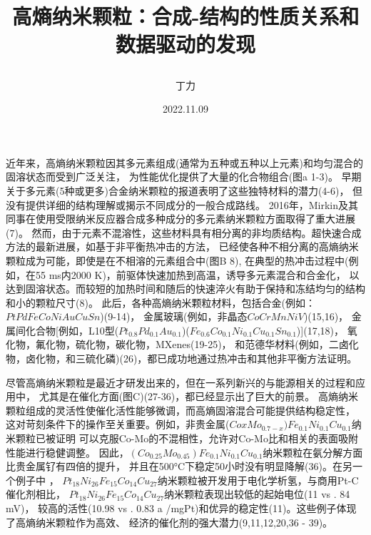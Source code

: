 \documentclass[a4paper]{article}
\title{
    高熵纳米颗粒：合成-结构的性质关系和数据驱动的发现
    
    }
\author{\songti 丁力}
\date{2022.11.09}
\begin{document}
    \maketitle
\iffalse
\begin{abstract}
    \lipsum[2]
\end{abstract}
\fi 
近年来，高熵纳米颗粒因其多元素组成(通常为五种或五种以上元素)和均匀混合的固溶状态而受到广泛关注，
为性能优化提供了大量的化合物组合(图a 1-3)。
早期关于多元素(5种或更多)合金纳米颗粒的报道表明了这些独特材料的潜力(4-6)，
但没有提供详细的结构理解或揭示不同成分的一般合成路线。
2016年，Mirkin及其同事在使用受限纳米反应器合成多种成分的多元素纳米颗粒方面取得了重大进展(7)。
然而，由于元素不混溶性，这些材料具有相分离的非均质结构。超快速合成方法的最新进展，如基于非平衡热冲击的方法，
已经使各种不相分离的高熵纳米颗粒成为可能，即使是在不相溶的元素组合中(图B 8),
在典型的热冲击过程中(例如，在55 ms内2000 K)，前驱体快速加热到高温，诱导多元素混合和合金化，
以达到固溶状态。而较短的加热时间和随后的快速淬火有助于保持和冻结均匀的结构和小的颗粒尺寸(8)。
此后，各种高熵纳米颗粒材料，包括合金(例如：$PtPdFeCoNiAuCuSn$)(9-14)，
金属玻璃(例如，非晶态$CoCrMnNiV$)(15,16)，
金属间化合物[例如，L10型($Pt_{0.8}Pd_{0.1}Au_{0.1}$)($Fe_{0.6}Co_{0.1}Ni_{0.1}Cu_{0.1}Sn_{0.1}$)](17,18)，
氧化物，氟化物，硫化物，碳化物，MXenes(19-25)，
和范德华材料(例如，二卤化物，卤化物，和三硫化磷)(26)，都已成功地通过热冲击和其他非平衡方法证明。


尽管高熵纳米颗粒是最近才研发出来的，但在一系列新兴的与能源相关的过程和应用中，
尤其是在催化方面(图C)(27-36)，都已经显示出了巨大的前景。
高熵纳米颗粒组成的灵活性使催化活性能够微调，而高熵固溶混合可能提供结构稳定性，
这对苛刻条件下的操作至关重要。例如，非贵金属($CoxMo_{0.7-x})Fe_{0.1}Ni_{0.1}Cu_{0.1}$纳米颗粒已被证明
可以克服Co-Mo的不混相性，允许对Co-Mo比和相关的表面吸附性能进行稳健调整。
因此，$(Co_{0.25}Mo_{0.45})Fe_{0.1}Ni_{0.1}Cu_{0.1}$纳米颗粒在氨分解方面比贵金属钌有四倍的提升，
并且在500°C下稳定50小时没有明显降解(36)。在另一个例子中 ，
$Pt_{18}Ni_{26}Fe_{15}Co_{14}Cu_{27}$纳米颗粒被开发用于电化学析氢，与商用Pt-C催化剂相比，
$Pt_{18}Ni_{26}Fe_{15}Co_{14}Cu_{27}$纳米颗粒表现出较低的起始电位(11 vs . 84 mV)，
较高的活性(10.98 vs . 0.83 a /mgPt)和优异的稳定性(11)。这些例子体现了高熵纳米颗粒作为高效、
经济的催化剂的强大潜力(9,11,12,20,36 - 39)。

\end{document}
